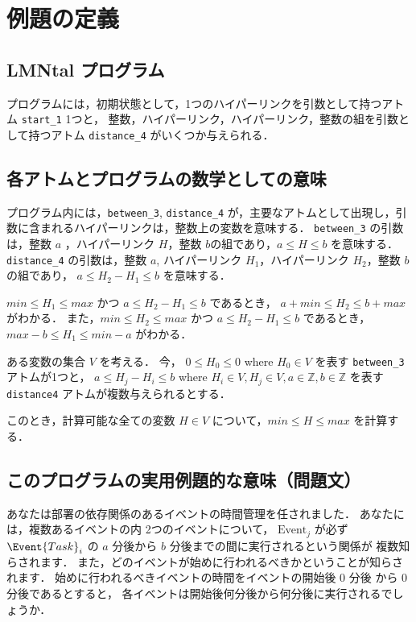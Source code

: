 \section{例題の定義}

\subsection{LMNtal プログラム}

プログラムには，初期状態として，1つのハイパーリンクを引数として持つアトム \texttt{start\_1} 1つと，
整数，ハイパーリンク，ハイパーリンク，整数の組を引数として持つアトム \texttt{distance\_4} がいくつか与えられる．



\subsection{各アトムとプログラムの数学としての意味}

プログラム内には，\texttt{between\_3}, \texttt{distance\_4} が，主要なアトムとして出現し，引数に含まれるハイパーリンクは，整数上の変数を意味する．
\texttt{between\_3} の引数は，整数 $a$ ，ハイパーリンク $H$，整数 $b$の組であり，$a \leq H \leq b$ を意味する．
\texttt{distance\_4} の引数は，整数 $a$, ハイパーリンク $H_1$，ハイパーリンク $H_2$，整数 $b$ の組であり， $a \leq H_2 - H_1 \leq b$ を意味する．

$min \leq H_1 \leq max$ かつ $a \leq H_2 - H_1 \leq b$ であるとき，
$a+min \leq H_2 \leq b+max $ がわかる．
また，$min \leq H_2 \leq max$ かつ $a \leq H_2 - H_1 \leq b$ であるとき，
$max-b \leq H_1 \leq min-a $ がわかる．


ある変数の集合 $V$ を考える．
今，
$0 \leq H_0 \leq 0$ where $H_0 \in V$ を表す \texttt{between\_3} アトムが1つと，
$a \leq H_j - H_i \leq b$ where $H_i \in V, H_j \in V, a \in \mathbb{Z}, b \in \mathbb{Z}$ を表す \texttt{distance4} アトムが複数与えられるとする．

このとき，計算可能な全ての変数 $H \in V$ について，$min \leq H \leq max$ を計算する．

\subsection{このプログラムの実用例題的な意味（問題文）}
あなたは部署の依存関係のあるイベントの時間管理を任されました．
あなたには，複数あるイベントの内 2つのイベントについて，
$\text{Event}_j$ が必ず $\Event{Task}_i$ の $a$ 分後から $b$ 分後までの間に実行されるという関係が
複数知らされます．
また，どのイベントが始めに行われるべきかということが知らされます．
始めに行われるべきイベントの時間をイベントの開始後 0 分後 から 0 分後であるとすると，
各イベントは開始後何分後から何分後に実行されるでしょうか．

